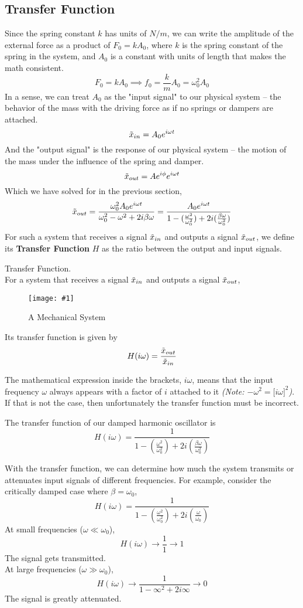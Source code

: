 \documentclass[11pt]{article}
\newcommand{\fig}[4]{
    \begin{figure}[H]
        \centering
        \texttt{[image: \#1]}
        \caption{#2}
        \label{exp4fit}
    \end{figure}
}
\theoremstyle{gangnamstyle}{\newtheorem{definition}{Definition}[]}
\theoremstyle{gangnamstyle}{\newtheorem{example}{Example}[]}
\theoremstyle{gangnamstyle}{\newtheorem{problem}{Problem}[]}
\theoremstyle{gangnamstyle}{\newtheorem{warning}{Warning}[]}
\begin{document}
\subsection{Transfer Function}

Since the spring constant $k$ has units of $N/m$, we can write the amplitude of the external force as a product of $F_0 = kA_0$, where $k$ is the spring constant of the spring in the system, and $A_0$ is a constant with units of length that makes the math consistent. 
\[ F_0 = kA_0 \implies f_0 = \frac{k}{m}A_0 = \omega_0^2A_0 \]
In a sense, we can treat $A_0$ as the "input signal" to our physical system -- the behavior of the mass with the driving force as if no springs or dampers are attached. 
\[ \Tilde{x}_{in} = A_0e^{i\omega t} \]
And the "output signal" is the response of our physical system -- the motion of the mass under the influence of the spring and damper. 
\[ \Tilde{x}_{out} = Ae^{i\phi}e^{i\omega t} \]
Which we have solved for in the previous section, 
\[ \Tilde{x}_{out} = \frac{\omega_0^2A_0e^{i\omega t}}{\omega_0^2 - \omega^2 + 2i\beta\omega} = \frac{A_0e^{i\omega t}}{1 - (\frac{\omega^2}{\omega_0^2}) + 2i(\frac{\beta\omega}{\omega_0^2})} \]
For such a system that receives a signal \textit{$\Tilde{x}_{in}$} and outputs a signal \textit{$\Tilde{x}_{out}$}, we define its \textbf{Transfer Function} $H$ as the ratio between the output and input signals. 

\begin{definition}
Transfer Function. \\
For a system that receives a signal $\Tilde{x}_{in}$ and outputs a signal $\Tilde{x}_{out}$, 
\fig{figs/n2/system.jpg}{A Mechanical System}{0.25}{0}
Its transfer function is given by
\begin{equation}
H(i\omega) = \frac{\Tilde{x}_{out}}{\Tilde{x}_{in}}
\end{equation}
\end{definition}

The mathematical expression inside the brackets, $i\omega$, means that the input frequency $\omega$ always appears with a factor of $i$ attached to it \textit{(Note: $-\omega^2 = \big[ i\omega \big]^2$)}. If that is not the case, then unfortunately the transfer function must be incorrect. 

The transfer function of our damped harmonic oscillator is
\[ H(i\omega) = \frac{1}{1 - (\frac{\omega^2}{\omega_0^2}) + 2i(\frac{\beta\omega}{\omega_0^2})} \]

With the transfer function, we can determine how much the system transmits or attenuates input signals of different frequencies. For example, consider the critically damped case where $\beta = \omega_0$, 
\[ H(i\omega) = \frac{1}{1 - (\frac{\omega^2}{\omega_0^2}) + 2i(\frac{\omega}{\omega_0})} \]
At small frequencies ($\omega \ll \omega_0$), 
\[ H(i\omega) \rightarrow \frac{1}{1} \rightarrow 1 \]
The signal gets transmitted. \\
At large frequencies ($\omega \gg \omega_0$), 
\[ H(i\omega) \rightarrow \frac{1}{1 - \infty^2 + 2i\infty} \rightarrow 0 \]
The signal is greatly attenuated. 
\pagebreak
\end{document}
